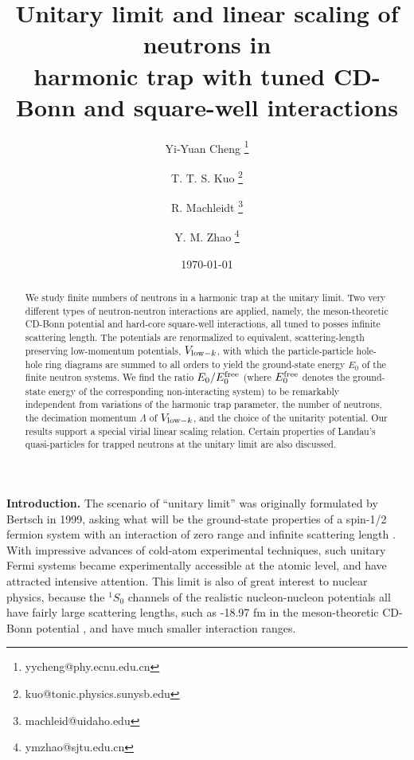 \documentclass[twocolumn,preprintnumbers,superscriptaddress]{revtex4}
\begin{document}
\title{Unitary limit and linear scaling of neutrons in\\
 harmonic trap with tuned CD-Bonn and square-well interactions}

\author{Yi-Yuan Cheng \footnote{yycheng@phy.ecnu.edu.cn}}

\author{T. T. S. Kuo \footnote{kuo@tonic.physics.sunysb.edu}}

\author{R. Machleidt \footnote{machleid@uidaho.edu}}

\author{Y. M. Zhao \footnote{ymzhao@sjtu.edu.cn}}

\date{\today}


\begin{abstract}
We study finite numbers of neutrons in a harmonic trap at the unitary limit.
Two very different types of neutron-neutron interactions
are applied, namely, the
meson-theoretic CD-Bonn potential and hard-core square-well interactions, all
tuned to posses infinite scattering length.
The potentials are renormalized
to equivalent, scattering-length preserving low-momentum potentials,
$V_{{\rm low}-k}$,
with which the particle-particle hole-hole
ring diagrams are summed to all orders
to yield the ground-state energy $E_0$ of the finite neutron systems.
We find the ratio
$E_0/E_0^{\rm free}$ (where $E_0^{\rm free}$ denotes
the ground-state energy of the corresponding non-interacting system)
to be remarkably independent from variations of the
harmonic trap parameter, the number of neutrons,
the decimation momentum $\Lambda$ of $V_{{\rm low}-k}$,
and the choice of the unitarity potential.
Our results support a special virial linear scaling relation.
Certain properties of Landau's quasi-particles
for trapped  neutrons at the unitary limit are also discussed.
\end{abstract}


\vspace{0.2in}

\maketitle


{\bf Introduction.}
The scenario of ``unitary limit'' was originally formulated by Bertsch in 1999,
asking what will be the ground-state properties of a spin-1/2 fermion system
with an interaction of zero range and infinite scattering length \cite{Bertsch}.
With impressive advances of cold-atom experimental techniques,
such unitary Fermi systems became experimentally accessible at the atomic level,
and have attracted intensive attention.
This limit is also of great interest to nuclear physics,
because the $^1S_0$ channels
of the realistic nucleon-nucleon potentials all have
fairly large scattering lengths,
such as -18.97 fm in the meson-theoretic CD-Bonn potential \cite{CDBonn},
and have much smaller interaction ranges.
\end{document}
